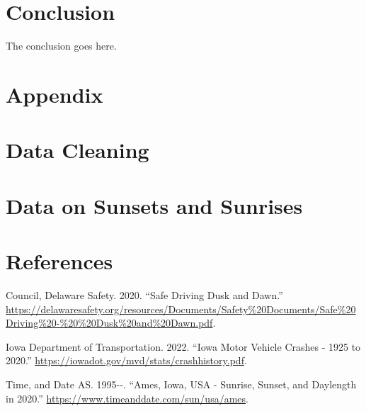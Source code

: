 \documentclass[conference,final,]{IEEEtran}
\newlength{\cslhangindent}
\newlength{\cslentryspacingunit} %
\newenvironment{CSLReferences}[2] %
 {%
  \setlength{\parindent}{0pt}
  \ifodd #1
  \let\oldpar\par
  \def\par{\hangindent=\cslhangindent\oldpar}
  \fi
  \setlength{\parskip}{#2\cslentryspacingunit}
 }%
 {}
\begin{document}
\hypertarget{conclusion-2}{%
\section{Conclusion}\label{conclusion-2}}

The conclusion goes here.

\clearpage

\hypertarget{appendix}{%
\section*{Appendix}\label{appendix}}

\hypertarget{data-cleaning}{%
\section{Data Cleaning}\label{data-cleaning}}

\hypertarget{data-on-sunsets-and-sunrises}{%
\section{Data on Sunsets and Sunrises}\label{data-on-sunsets-and-sunrises}}

\clearpage

\hypertarget{references}{%
\section*{References}\label{references}}

\hypertarget{refs}{}
\begin{CSLReferences}{1}{0}
\leavevmode{}%
Council, Delaware Safety. 2020. {``Safe Driving Dusk and Dawn.''} \url{https://delawaresafety.org/resources/Documents/Safety\%20Documents/Safe\%20Driving\%20-\%20\%20Dusk\%20and\%20Dawn.pdf}.

\leavevmode{}%
Iowa Department of Transportation. 2022. {``Iowa Motor Vehicle Crashes - 1925 to 2020.''} \url{https://iowadot.gov/mvd/stats/crashhistory.pdf}.

\leavevmode{}%
Time, and Date AS. 1995-\/-. {``Ames, Iowa, USA - Sunrise, Sunset, and Daylength in 2020.''} \url{https://www.timeanddate.com/sun/usa/ames}.

\end{CSLReferences}
\end{document}
